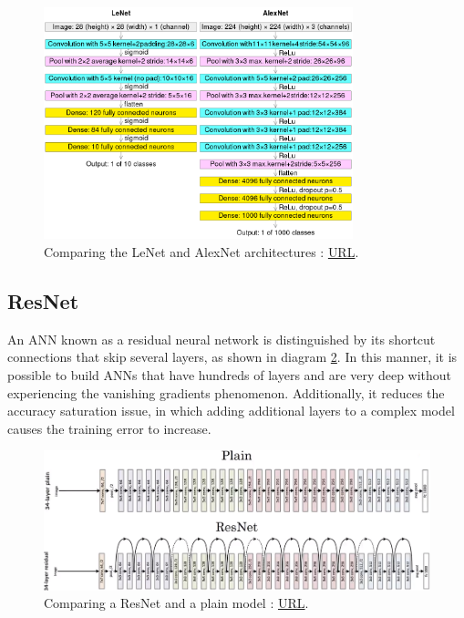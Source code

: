 \begin{figure}[H]
    \centering
        \includegraphics[width=0.8\textwidth]{Images/ANNArchitectures/lenet_vs_alexnet.png}
        \decoRule
        \caption[Comparing LeNet-5 and AlexNet]{Comparing the LeNet and AlexNet architectures \cite{AlexNet_wiki}: \href{https://en.wikipedia.org/wiki/AlexNet\#/media/File:Comparison_image_neural_networks.svg}{URL}.}
        \label{fig:Lenet_Alexnet_Comparison}
\end{figure}

\subsection{ResNet}
An ANN known as a residual neural network is distinguished by its shortcut connections that skip several layers, as shown in diagram \ref{fig:ResNet_Plain_Comparison}. In this manner, it is possible to build ANNs that have hundreds of layers and are very deep without experiencing the vanishing gradients phenomenon. Additionally, it reduces the accuracy saturation issue, in which adding additional layers to a complex model causes the training error to increase.
\begin{figure}[H]
    \centering
        \includegraphics[width=1\textwidth]{Images/ANNArchitectures/resnet_vs_plain.png}
        \decoRule
        \caption[Comparing ResNet and plain architectures]{Comparing a ResNet and a plain model \cite{resnet_image}: \href{https://towardsdatascience.com/review-resnet-winner-of-ilsvrc-2015-image-classification-localization-detection-e39402bfa5d8}{URL}.}
        \label{fig:ResNet_Plain_Comparison}
\end{figure}

